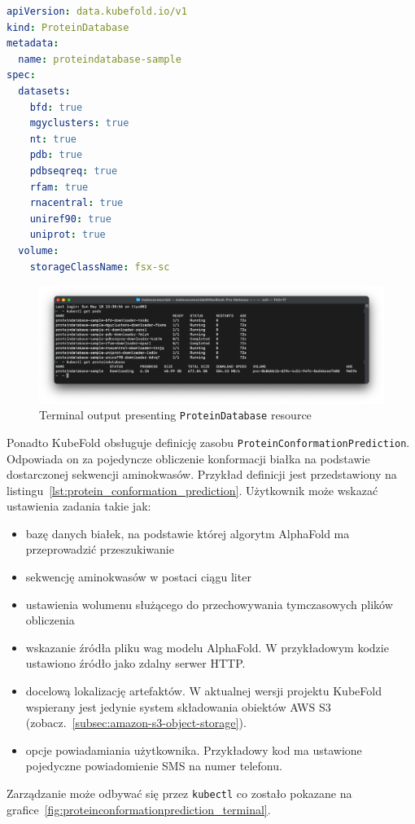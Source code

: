 \begin{lstlisting}[language=yaml,caption={Przykładowy kod YAML zasobu ProteinDatabase},label={lst:protein_database}]
apiVersion: data.kubefold.io/v1
kind: ProteinDatabase
metadata:
  name: proteindatabase-sample
spec:
  datasets:
    bfd: true
    mgyclusters: true
    nt: true
    pdb: true
    pdbseqreq: true
    rfam: true
    rnacentral: true
    uniref90: true
    uniprot: true
  volume:
    storageClassName: fsx-sc
\end{lstlisting}

\begin{figure}[htbp]
    \centering
    \includegraphics[width=\textwidth]{images/proteindatabase_terminal}
    \caption{Terminal output presenting \texttt{ProteinDatabase} resource}
    \label{fig:proteindatabase_terminal}
\end{figure}

Ponadto KubeFold obsługuje definicję zasobu \texttt{ProteinConformationPrediction}.
Odpowiada on za pojedyncze obliczenie konformacji białka na podstawie dostarczonej sekwencji aminokwasów.
Przykład definicji jest przedstawiony na listingu~\ref{lst:protein_conformation_prediction}.
Użytkownik może wskazać ustawienia zadania takie jak:
\begin{itemize}
    \item bazę danych białek, na podstawie której algorytm AlphaFold ma przeprowadzić przeszukiwanie
    \item sekwencję aminokwasów w postaci ciągu liter
    \item ustawienia wolumenu służącego do przechowywania tymczasowych plików obliczenia
    \item wskazanie źródła pliku wag modelu AlphaFold.
    W przykładowym kodzie ustawiono źródło jako zdalny serwer HTTP.
    \item docelową lokalizację artefaktów.
    W aktualnej wersji projektu KubeFold wspierany jest jedynie system składowania obiektów AWS S3 (zobacz.~\ref{subsec:amazon-s3-object-storage}).
    \item opcje powiadamiania użytkownika.
    Przykładowy kod ma ustawione pojedyczne powiadomienie SMS na numer telefonu.
\end{itemize}
Zarządzanie może odbywać się przez \texttt{kubectl} co zostało pokazane na grafice~\ref{fig:proteinconformationprediction_terminal}.

